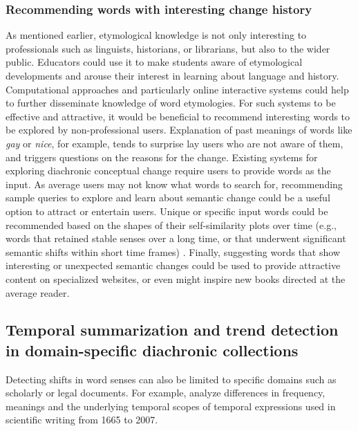 \documentclass[output=paper]{langsci/langscibook}
\begin{document}
\subsubsection{Recommending words with interesting change history} 
As mentioned earlier, etymological knowledge is not only interesting to professionals such as linguists, historians, or librarians, but also to the wider public. Educators could use it to make students  aware of etymological developments and arouse their interest in learning about language and history.
Computational approaches and particularly online interactive systems  could  help to further disseminate knowledge of word etymologies. For such systems to be effective and attractive, it would be beneficial to recommend interesting words to be explored by non-professional users. 
Explanation of past meanings of words like \emph{gay} or \emph{nice}, for example, tends to surprise lay users who are not aware of them, and triggers  questions on the reasons for the change. Existing systems for exploring diachronic conceptual change require users to provide words as the input. As average users may not know what words to search for, recommending sample queries to explore and learn about semantic change could be a useful option to attract or entertain users.  Unique or specific input words could be recommended based on the shapes of their self-similarity plots over time (e.g., words that retained stable senses over a long time, or that underwent significant semantic shifts within short time frames) \citep{jatowt2018every}. 
Finally, suggesting words that show interesting or unexpected semantic changes could be used to provide attractive content on specialized websites, or even might inspire new books directed at the average reader. 

\subsection{Temporal summarization and trend detection in domain-specific diachronic collections} 
Detecting shifts in word senses can also be  limited to specific domains such as scholarly or legal documents. For example, \citet{degaetano2017diachronic} analyze differences in frequency, meanings and the underlying temporal scopes of temporal expressions used in scientific writing from 1665 to 2007. 
\end{document}
